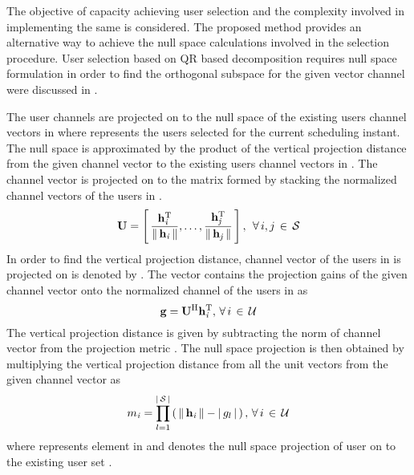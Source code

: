 
The objective of capacity achieving user selection and the complexity involved in implementing the same is considered. The proposed method provides an alternative way to achieve the null space calculations involved in the selection procedure. User selection based on QR based decomposition requires null space formulation in order to find the orthogonal subspace for the given vector channel were discussed in \cite{zhang2007user,antti_user_selection,traniterative,sun2009eigenmode}.

The user channels are projected on to the null space of the existing users channel vectors in  where  represents the users selected for the current scheduling instant. The null space is approximated by the product of the vertical projection distance from the given channel vector to the existing users channel vectors in . The channel vector  is projected on to the matrix  formed by stacking the normalized channel vectors of the users in .
\begin{equation}
\mathbf{U} = \left [ \, \frac{\mathbf{h}_{\mathit{i}}^{\mathrm{T}}}{\|\, \mathbf{h}_{\mathit{i}} \,\|}, \dotsc, \frac{\mathbf{h}_{\mathit{j}}^{\mathrm{T}}}{\|\, \mathbf{h}_{\mathit{j}} \,\|} \, \right ], \; \, \forall \, i,j \, \in \, \mathcal{S}
\label{mca2-e1}
\end{equation}
In order to find the vertical projection distance, channel vector of the users in  is projected on  is  denoted by . The vector  contains the projection gains of the given channel vector onto the normalized channel of the users in  as
\begin{equation}
\mathbf{g} = \mathbf{U}^{\mathrm{H}} \mathbf{h}_{\mathit{i}}^{\mathrm{T}}, \, \forall \, i \, \in \, \mathcal{U}
\label{mca2-e2}
\end{equation}
The vertical projection distance is given by subtracting the norm of channel vector from the projection metric . The null space projection is then obtained by multiplying the vertical projection distance from all the unit vectors from the given channel vector as
\begin{equation}
{m}_{\mathit{i}} = \prod^{| \, \mathcal{S} \, |}_{l = 1} \left ( \, \|\, \mathbf{h}_{\mathit{i}} \,\| - | \, g_l \, | \, \right ), \, \forall \, i \, \in \, \mathcal{U}
\label{mca2-e3}
\end{equation}
where  represents  element in  and  denotes the null space projection of user  on to the existing user set .


